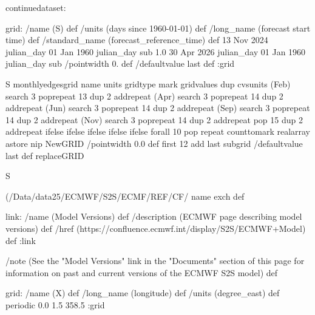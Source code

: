 \begin{ingrid}
continuedataset:


grid:
/name (S) def
/units (days since 1960-01-01) def
/long_name (forecast start time) def
/standard_name (forecast_reference_time) def
13 Nov 2024 julian_day 01 Jan 1960 julian_day sub
1.0
30 Apr 2026 julian_day
01 Jan 1960 julian_day sub
/pointwidth 0. def
/defaultvalue { last } def
:grid

S monthlyedgesgrid
   name units gridtype mark gridvalues
        {dup cvsunits (Feb) search {3 {pop}repeat 13 {dup 2 add}repeat}{ 
         (Apr) search {3 {pop}repeat 14 {dup 2 add}repeat} { 
            (Jun) search {3 {pop}repeat 14 {dup 2 add}repeat} { 
               (Sep) search {3 {pop}repeat 14 {dup 2 add}repeat} { 
                  (Nov) search {3 {pop}repeat 14 {dup 2 add}repeat} 
                     {pop 15 {dup 2 add}repeat}
                     ifelse}
                  ifelse}
               ifelse}
            ifelse}
         ifelse
         }forall  
         10 {pop} repeat %
         counttomark realarray astore
        nip NewGRID
    /pointwidth 0.0 def
    first 12 add last subgrid
    /defaultvalue { last } def
    replaceGRID


S {(/Data/data25/ECMWF/S2S/ECMF/REF/CF/%
name exch def



link:
 /name (Model Versions) def
 /description (ECMWF page describing model versions) def
 /href (https://confluence.ecmwf.int/display/S2S/ECMWF+Model) def
:link

/note (See the "Model Versions" link in the "Documents" section of this page for information on past and current versions of the ECMWF S2S model) def

grid:
/name (X) def
/long_name (longitude) def
/units (degree_east) def
periodic
0.0 1.5 358.5
:grid

}
\end{ingrid}
